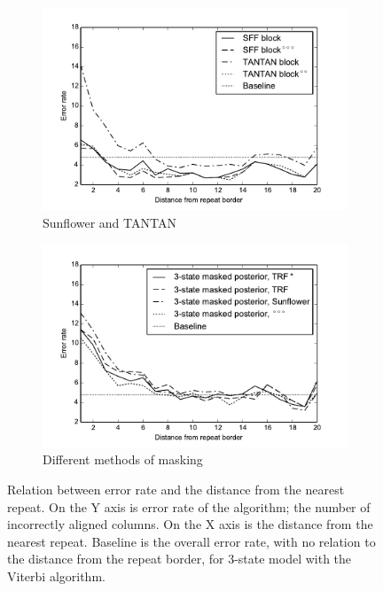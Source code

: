 \begin{figure}
\begin{center}
\begin{subfigure}{0.5\textwidth}
\includegraphics[width=\textwidth]{../figures/error_graph_sffvstantan.pdf}
\caption{Sunflower and TANTAN}\label{FIGURE:SFFTANTAN}
\end{subfigure}%
\begin{subfigure}{0.5\textwidth}
\includegraphics[width=\textwidth]{../figures/error_graph_3statemasking.pdf}
\caption{Different methods of masking}
\end{subfigure}%
\caption{
Relation between error rate and the distance from the nearest repeat. On the Y
axis is error rate of the algorithm; the number of incorrectly aligned columns.
On the X axis is the distance from the nearest repeat. Baseline is the overall
error rate, with no relation to the distance from the repeat border, for
3-state model with the Viterbi algorithm.
}\label{FIGURE:SFF_GRAPHS} 
\end{center}
\end{figure}

